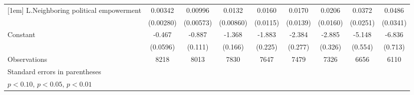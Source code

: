 \begin{table}[htbp]
\begin{tabular}{l*{8}{c}}
[1em]
L.Neighboring political empowerment&     0.00342         &     0.00996\sym{*}  &      0.0132         &      0.0160         &      0.0170         &      0.0206         &      0.0372         &      0.0486         \\
                    &   (0.00280)         &   (0.00573)         &   (0.00860)         &    (0.0115)         &    (0.0139)         &    (0.0160)         &    (0.0251)         &    (0.0341)         \\
[1em]
Constant            &      -0.467\sym{***}&      -0.887\sym{***}&      -1.368\sym{***}&      -1.883\sym{***}&      -2.384\sym{***}&      -2.885\sym{***}&      -5.148\sym{***}&      -6.836\sym{***}\\
                    &    (0.0596)         &     (0.111)         &     (0.166)         &     (0.225)         &     (0.277)         &     (0.326)         &     (0.554)         &     (0.713)         \\
\hline
Observations        &        8218         &        8013         &        7830         &        7647         &        7479         &        7326         &        6656         &        6110         \\
\hline\hline
\multicolumn{9}{l}{\footnotesize Standard errors in parentheses}\\
\multicolumn{9}{l}{\footnotesize \sym{*} \(p<0.10\), \sym{**} \(p<0.05\), \sym{***} \(p<0.01\)}\\
\end{tabular}
\end{table}
